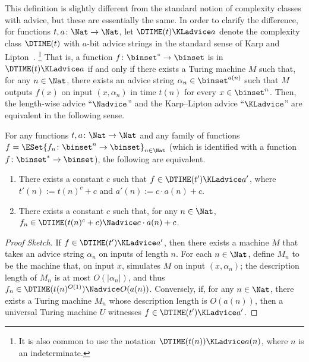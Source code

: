 \documentclass{toc}
\begin{document}
%
This definition is slightly different from the standard notion of complexity classes with advice,
but these are essentially the same.
In order to clarify the difference,
for functions $t, a \colon \Nat \to \Nat$,
let $\DTIME(t) \KLadvice a$ denote
the complexity class $\DTIME(t)$ with $a$-bit advice strings
in the standard sense of Karp and Lipton~\cite{KarpL82_advice}.%
\footnote{
  It is also common to use the notation $\DTIME(t(n)) \KLadvice a(n)$,
  where $n$ is an indeterminate.
}
That is, a function $f \colon \binset^* \to \binset$ is in $\DTIME(t) \KLadvice a$
if and only if
there exists a Turing machine $M$ such that, for any $n \in \Nat$,
there exists an advice string $\alpha_n \in \binset^{a(n)}$
such that
$M$ outputs $f(x)$ on input $(x, \alpha_n)$
in time $t(n)$
for every $x \in \binset^n$.
Then, the length-wise advice ``$\Nadvice$'' and the Karp--Lipton advice ``$\KLadvice$'' are
equivalent in the following sense.
\begin{fact}
  For any functions $t, a \colon \Nat \to \Nat$
  and any family of functions $f = \ESet{ f_n \colon \binset^n \to \binset }_{n \in \Nat}$
  \textup{(}which is identified with a function $f \colon \binset^* \to \binset$\textup{)},
  the following are equivalent.
  \begin{enumerate}
    \item
          There exists a constant $c$ such that $f \in \DTIME(t') \KLadvice a'$,
          where
          $t'(n) := t(n)^c + c$ and $a'(n) := c \cdot a(n) + c$.
    \item
          There exists a constant $c$ such that, for any $n \in \Nat$,
          $f_n \in \DTIME(t(n)^c + c) \Nadvice c \cdot a(n) + c$.
  \end{enumerate}
\end{fact}
\begin{proof}
  [Proof Sketch]
  If $f \in \DTIME(t') \KLadvice a'$,
  then there exists a machine $M$ that takes an advice string $\alpha_n$ on inputs of length $n$.
  For each $n \in \Nat$, define $M_n$ to be the machine that, on input $x$, simulates $M$ on input $(x, \alpha_n)$; the description length of $M_n$ is at most $O(|\alpha_n|)$, and thus $f_n \in \DTIME(t(n)^{O(1)}) \Nadvice O(a(n))$.
  Conversely, if, for any $n \in \Nat$, there exists a Turing machine $M_n$ whose description length is $O(a(n))$, then
  a universal Turing machine $U$ witnesses $f \in \DTIME(t') \KLadvice a'$.
\end{proof}
\end{document}
